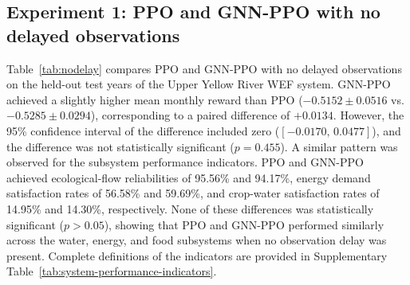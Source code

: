 \documentclass [a4paper,fleqn] {cas-dc}
\begin{document}

\subsection{Experiment 1: PPO and GNN-PPO with no delayed observations}
\label{sec42}
Table~\ref{tab:nodelay} compares PPO and GNN-PPO with no delayed observations on the held-out test years of the Upper Yellow River WEF system. GNN-PPO achieved a slightly higher mean monthly reward than PPO ($-0.5152 \pm 0.0516$ vs. $-0.5285 \pm 0.0294$), corresponding to a paired difference of $+0.0134$. However, the 95\% confidence interval of the difference included zero ($[-0.0170,\,0.0477]$), and the difference was not statistically significant ($p=0.455$). A similar pattern was observed for the subsystem performance indicators. PPO and GNN-PPO achieved ecological-flow reliabilities of 95.56\% and 94.17\%, energy demand satisfaction rates of 56.58\% and 59.69\%, and crop-water satisfaction rates of 14.95\% and 14.30\%, respectively. None of these differences was statistically significant ($p>0.05$), showing that PPO and GNN-PPO performed similarly across the water, energy, and food subsystems when no observation delay was present. Complete definitions of the indicators are provided in Supplementary Table~\ref{tab:system-performance-indicators}.
\end{document}
